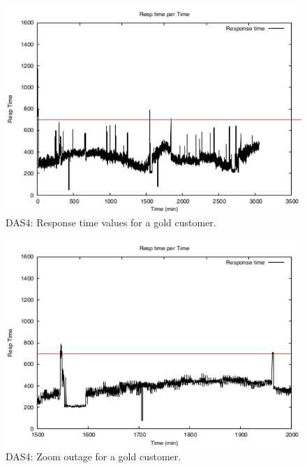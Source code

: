 \begin{figure}
  \begin{center}
    \includegraphics[width=.85\linewidth]{images/exps2011/high/das/proxyDataPoints_output.pdf}
  \end{center}
\vspace{-5mm}
  \caption{DAS4: Response time values for a gold customer.}
  \label{highResponseTime}
\end{figure}

\begin{figure}
  \begin{center}
    \includegraphics[width=.85\linewidth]{images/exps2011/high/das/proxyDataPoints_output_filtered.pdf}
  \end{center}
\vspace{-5mm}
  \caption{DAS4: Zoom outage for a gold customer.}
  \label{zoomOutage}
\end{figure}

